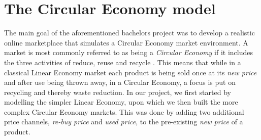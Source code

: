 
\section{The Circular Economy model}\label{sec:CircularEconomy}
The main goal of the aforementioned bachelors project was to develop a realistic online marketplace that simulates a Circular Economy market environment. A market is most commonly referred to as being a \emph{Circular Economy} if it includes the three activities of reduce, reuse and recycle \cite{circularEconomyDefinition}. This means that while in a classical Linear Economy market each product is being sold once at its \emph{new price} and after use being thrown away, in a Circular Economy, a focus is put on recycling and thereby waste reduction. In our project, we first started by modelling the simpler Linear Economy, upon which we then built the more complex Circular Economy markets. This was done by adding two additional price channels, \emph{re-buy price} and \emph{used price}, to the pre-existing \emph{new price} of a product.

